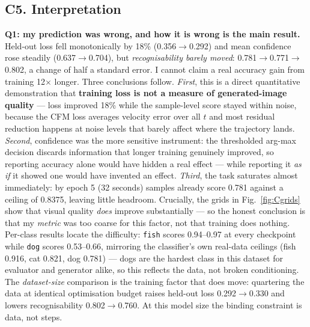 \documentclass[10pt,a4paper]{article}
\begin{document}
\subsection{C5. Interpretation}

\textbf{Q1: my prediction was wrong, and how it is wrong is the main result.} Held-out loss fell
monotonically by 18\% (0.356$\to$0.292) and mean confidence rose steadily (0.637$\to$0.704), but
\emph{recognisability barely moved}: 0.781$\to$0.771$\to$0.802, a change of half a standard error. I
cannot claim a real accuracy gain from training 12$\times$ longer. Three conclusions follow.
\emph{First}, this is a direct quantitative demonstration that \textbf{training loss is not a measure
of generated-image quality} --- loss improved 18\% while the sample-level score stayed within noise,
because the CFM loss averages velocity error over all $t$ and most residual reduction happens at noise
levels that barely affect where the trajectory lands. \emph{Second}, confidence was the more sensitive
instrument: the thresholded arg-max decision discards information that longer training genuinely
improved, so reporting accuracy alone would have hidden a real effect --- while reporting it \emph{as
if} it showed one would have invented an effect. \emph{Third}, the task saturates almost immediately:
by epoch 5 (32 seconds) samples already score 0.781 against a ceiling of 0.8375, leaving little
headroom. Crucially, the grids in Fig.~\ref{fig:Cgrids} show that visual quality \emph{does} improve
substantially --- so the honest conclusion is that my \emph{metric} was too coarse for this factor,
not that training does nothing. Per-class results locate the difficulty: \texttt{fish} scores
0.94--0.97 at every checkpoint while \texttt{dog} scores 0.53--0.66, mirroring the classifier's own
real-data ceilings (fish 0.916, cat 0.821, dog 0.781) --- dogs are the hardest class in this dataset
for evaluator and generator alike, so this reflects the data, not broken conditioning. The
\emph{dataset-size} comparison is the training factor that does move: quartering the data at identical
optimisation budget raises held-out loss 0.292$\to$0.330 and lowers recognisability 0.802$\to$0.760.
At this model size the binding constraint is data, not steps.
\end{document}
